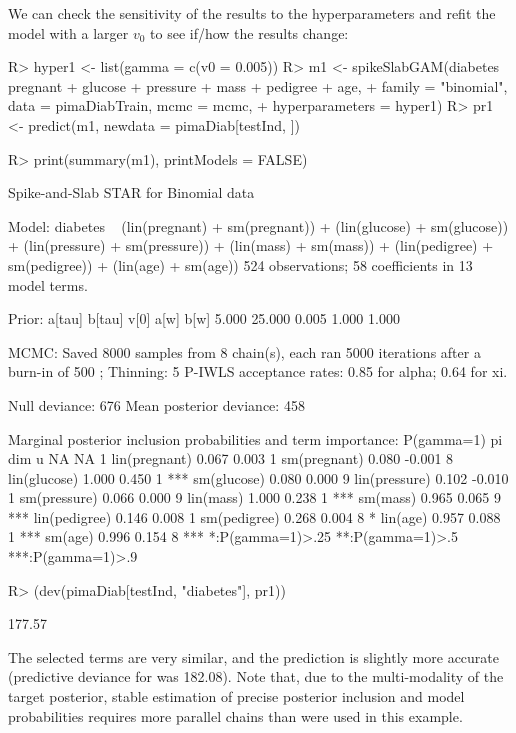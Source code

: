 \documentclass[article, shortnames, nojss, noheadings, notitle]{jss}
\begin{document}
We can check the sensitivity of the results to the hyperparameters and refit the
model with a larger $v_0$ to see if/how the results change:
\begin{Schunk}
\begin{Sinput}
R> hyper1 <- list(gamma = c(v0 = 0.005))
R> m1 <- spikeSlabGAM(diabetes ~ pregnant + glucose + pressure + mass + pedigree + age,
+                     family = "binomial", data = pimaDiabTrain, mcmc = mcmc,
+                     hyperparameters = hyper1)
R> pr1 <- predict(m1, newdata = pimaDiab[testInd, ])
\end{Sinput}
\end{Schunk}
\begin{Schunk}
\begin{Sinput}
R> print(summary(m1), printModels = FALSE)
\end{Sinput}
\begin{Soutput}
Spike-and-Slab STAR for Binomial data 

Model:
diabetes ~ (lin(pregnant) + sm(pregnant)) + (lin(glucose) + sm(glucose)) + 
    (lin(pressure) + sm(pressure)) + (lin(mass) + sm(mass)) + 
    (lin(pedigree) + sm(pedigree)) + (lin(age) + sm(age))
524 observations; 58 coefficients in 13 model terms.

Prior:
a[tau] b[tau]   v[0]   a[w]   b[w] 
 5.000 25.000  0.005  1.000  1.000 

MCMC:
Saved 8000 samples from 8 chain(s), each ran 5000 iterations after a
  burn-in of 500 ; Thinning: 5
P-IWLS acceptance rates: 0.85 for alpha; 0.64 for xi.
                            
Null deviance:           676
Mean posterior deviance: 458

Marginal posterior inclusion probabilities and term importance:
              P(gamma=1)     pi dim    
u                     NA     NA   1    
lin(pregnant)      0.067  0.003   1    
sm(pregnant)       0.080 -0.001   8    
lin(glucose)       1.000  0.450   1 ***
sm(glucose)        0.080  0.000   9    
lin(pressure)      0.102 -0.010   1    
sm(pressure)       0.066  0.000   9    
lin(mass)          1.000  0.238   1 ***
sm(mass)           0.965  0.065   9 ***
lin(pedigree)      0.146  0.008   1    
sm(pedigree)       0.268  0.004   8   *
lin(age)           0.957  0.088   1 ***
sm(age)            0.996  0.154   8 ***
*:P(gamma=1)>.25 **:P(gamma=1)>.5 ***:P(gamma=1)>.9
\end{Soutput}
\begin{Sinput}
R> (dev(pimaDiab[testInd, "diabetes"], pr1))
\end{Sinput}
\begin{Soutput}
[1] 177.57
\end{Soutput}
\end{Schunk}
The selected terms are very similar, and the prediction is slightly more accurate
(predictive deviance for  was 182.08).
Note that, due to the multi-modality of the target posterior, stable estimation of precise posterior inclusion and
model probabilities requires more parallel chains than were used in this example.
\end{document}
